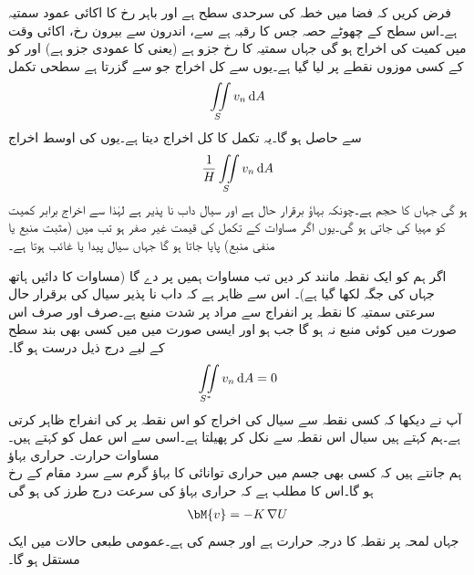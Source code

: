 فرض کریں کہ فضا میں خطہ  کی سرحدی سطح  ہے اور  باہر رخ  کا اکائی عمود سمتیہ ہے۔اس سطح کے چھوٹے حصہ  جس کا رقبہ  ہے سے،  اندرون  سے بیرون   رخ، اکائی وقت میں کمیت کی اخراج  ہو گی جہاں  سمتیہ  کا   رخ جزو ہے (یعنی  کا عمودی جزو ہے) اور  کو  کے کسی موزوں نقطے پر لیا گیا ہے۔یوں  سے کل اخراج جو  سے گزرتا ہے سطحی تکمل
\begin{align*}
\iint\limits_S v_n \dif A
\end{align*}
سے حاصل ہو گا۔یہ تکمل  کا کل اخراج دیتا ہے۔یوں  کی اوسط اخراج
\begin{align}\label{مساوات_خطی_تکمل_پھیلاو_مثال_ت}
\frac{1}{H}\iint\limits_S v_n\dif A
\end{align}
ہو گی جہاں  کا حجم  ہے۔چونکہ بہاؤ برقرار حال ہے اور سیال داب نا پذیر ہے لہٰذا  سے  اخراج برابر کمیت  کو  مہیا کی جاتی ہو گی۔یوں اگر مساوات  کے تکمل کی قیمت غیر صفر ہو تب  میں  (مثبت منبع یا منفی منبع) پایا جاتا ہو گا جہاں سیال پیدا یا غائب ہوتا ہے۔

اگر ہم  کو ایک نقطہ  مانند کر دیں تب  مساوات  ہمیں  پر  دے گا (مساوات  کا دائیں ہاتھ جہاں  کی جگہ  لکھا گیا ہے)۔ اس سے ظاہر ہے کہ داب نا پذیر سیال کی برقرار حال  سرعتی سمتیہ   کا نقطہ  پر انفراج سے مراد  پر شدت منبع ہے۔صرف اور صرف اس صورت  میں کوئی منبع نہ ہو گا جب  ہو اور ایسی صورت میں  میں کسی بھی بند سطح  کے لیے درج ذیل درست ہو گا۔
\begin{align*}
\iint\limits_{S^*}v_n\dif A=0
\end{align*}
آپ نے دیکھا کہ  کسی نقطہ سے سیال کی اخراج کو اس نقطہ پر  کی انفراج ظاہر کرتی ہے۔ہم کہتے ہیں سیال اس نقطہ سے نکل کر پھیلتا ہے۔اسی سے اس عمل کو  کہتے ہیں۔ 
\quad مساوات حرارت۔ حراری بہاؤ\\
ہم جانتے ہیں کہ کسی بھی جسم میں حراری توانائی کا بہاؤ  گرم سے سرد مقام کے رخ  ہو گا۔اس کا مطلب ہے کہ حراری بہاؤ کی سرعت  درج طرز کی ہو گی
\begin{align}\label{مساوات_خطی_تکمل_حراری_اخراج_الف}
\bM{v}=-K\,\nabla U
\end{align}
جہاں  لمحہ  پر نقطہ  کا درجہ حرارت ہے اور  جسم کی  ہے۔عمومی طبعی حالات میں  ایک مستقل ہو گا۔
 
